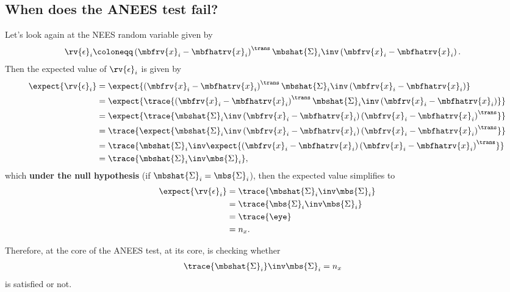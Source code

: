 \documentclass{simple-article}
\begin{document}
\subsection{When does the ANEES test fail?}
\label{eq:When does the ANEES test fail}
Let's look again at the NEES random variable given by
\begin{align}
  \rv{\epsilon}_{i} &\coloneqq \left( \mbfrv{x}_{i} - \mbfhatrv{x}_{i} \right)^{\trans}\mbshat{\Sigma}_{i}\inv\left( \mbfrv{x}_{i} - \mbfhatrv{x}_{i} \right).
\end{align}
Then the expected value of $\rv{\epsilon}_{i}$ is given by
\begin{align}
  \expect{\rv{\epsilon}_{i}} &= \expect{\left( \mbfrv{x}_{i} - \mbfhatrv{x}_{i} \right)^{\trans}\mbshat{\Sigma}_{i}\inv\left( \mbfrv{x}_{i} - \mbfhatrv{x}_{i} \right)}\\
                             &= \expect{\trace{\left( \mbfrv{x}_{i} - \mbfhatrv{x}_{i} \right)^{\trans}\mbshat{\Sigma}_{i}\inv\left( \mbfrv{x}_{i} - \mbfhatrv{x}_{i} \right)}}\\
                             &= \expect{\trace{\mbshat{\Sigma}_{i}\inv\left( \mbfrv{x}_{i} - \mbfhatrv{x}_{i} \right)\left( \mbfrv{x}_{i} - \mbfhatrv{x}_{i} \right)^{\trans}}}\\
                             &= \trace{\expect{\mbshat{\Sigma}_{i}\inv\left( \mbfrv{x}_{i} - \mbfhatrv{x}_{i} \right)\left( \mbfrv{x}_{i} - \mbfhatrv{x}_{i} \right)^{\trans}}}\\
                             &= \trace{\mbshat{\Sigma}_{i}\inv\expect{\left( \mbfrv{x}_{i} - \mbfhatrv{x}_{i} \right)\left( \mbfrv{x}_{i} - \mbfhatrv{x}_{i} \right)^{\trans}}}\\
                             &= \trace{\mbshat{\Sigma}_{i}\inv\mbs{\Sigma}_{i}},
\end{align}
which \textbf{under the null hypothesis} (if $\mbshat{\Sigma}_{i}=\mbs{\Sigma}_{i}$), then the expected value simplifies to
\begin{align}
  \expect{\rv{\epsilon}_{i}} &= \trace{\mbshat{\Sigma}_{i}\inv\mbs{\Sigma}_{i}}\\
                             &=\trace{\mbs{\Sigma}_{i}\inv\mbs{\Sigma}_{i}}\\
                             &= \trace{\eye}\\
                             &= n_{x}.
\end{align}
\begin{blackBox}
  Therefore, at the core of the ANEES test, at its core, is checking whether
  \begin{align}
    \label{eq:anees expression core}
    \trace{\mbshat{\Sigma}_{i}}\inv\mbs{\Sigma}_{i} &= n_{x}
  \end{align}
  is satisfied or not.
\end{blackBox}
\end{document}
